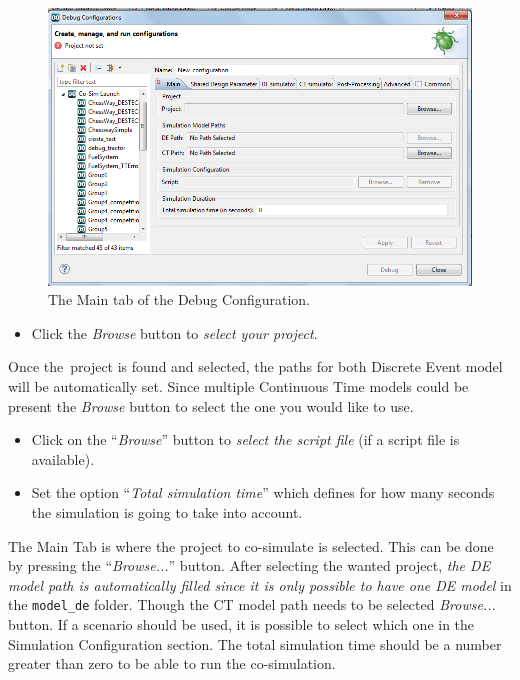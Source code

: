 \documentclass{crescendorepchap}
\begin{document}
\begin{figure}[htbp]
\centering
\includegraphics[width=.8\textwidth]{images/DestecsDebugConfigurationMain.png}
\caption{The Main tab of the Debug Configuration.\label{fig:DestecsDebugConfigurationMain}}
\end{figure}

\begin{itemize}
\item
  Click the \emph{Browse} button to \emph{select your project}.
\end{itemize}

Once the~project is found and selected, the paths for both Discrete
Event model will be automatically set. Since multiple Continuous Time
models could be present the \emph{Browse} button to select the one
you would like to use.

\begin{itemize}
\item
  Click on the ``\emph{Browse}'' button to \emph{select the script file}
  (if a script file is available).
\item
  Set the option ``\emph{Total simulation time}'' which defines for how 
  many seconds the simulation is going to take into account.
\end{itemize}

The Main Tab is where the project to co-simulate is selected. This can
be done by pressing the ``\emph{Browse...}'' button. After selecting the
wanted project, \emph{the DE model path is automatically filled
since it is only possible to have one DE model} in the \texttt{model\_de}
folder. Though the CT model path needs to be selected \emph{Browse...}
button. If a scenario should be used, it is possible
to select which one in the Simulation Configuration section. The total
simulation time should be a number greater than zero to be able to run
the co-simulation.
\end{document}
